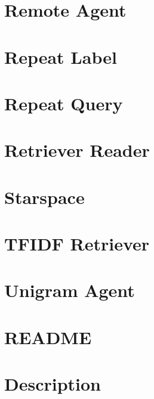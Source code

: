 \documentclass[twoside]{book}
\newcommand{\+}{\discretionary{\mbox{\scriptsize$\hookleftarrow$}}{}{}}
\begin{document}
\chapter{Remote Agent}
\label{md_parlai_agents_remote_agent_README}

\chapter{Repeat Label}
\label{md_parlai_agents_repeat_label_README}

\chapter{Repeat Query}
\label{md_parlai_agents_repeat_query_README}

\chapter{Retriever Reader}
\label{md_parlai_agents_retriever_reader_README}

\chapter{Starspace}
\label{md_parlai_agents_starspace_README}

\chapter{T\+F\+I\+DF Retriever}
\label{md_parlai_agents_tfidf_retriever_README}

\chapter{Unigram Agent}
\label{md_parlai_agents_unigram_README}

\chapter{R\+E\+A\+D\+ME}
\label{md_parlai_core_README}

\chapter{Description}
\label{md_parlai_mturk_core_dev_react_server_README}

\end{document}
